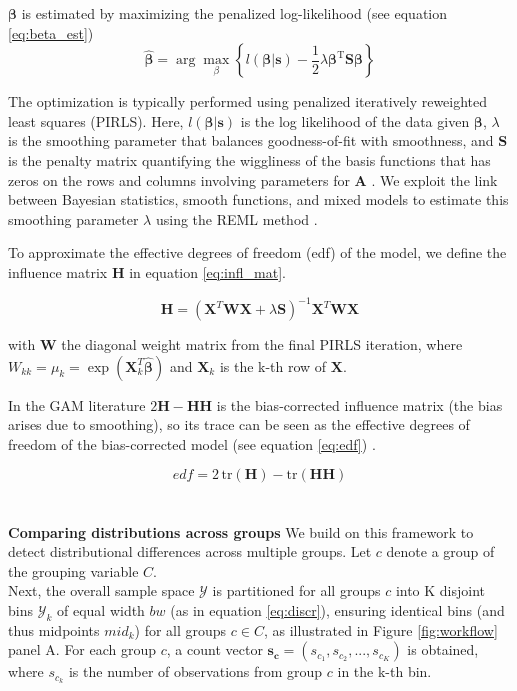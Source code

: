 $\boldsymbol{\beta}$ is estimated by maximizing the penalized log-likelihood (see equation \ref{eq:beta_est})
\begin{equation}
    \hat{\boldsymbol{\beta}}=\arg \max _{\beta}\left\{l(\boldsymbol{\beta}|\boldsymbol{s})-\frac{1}{2} \lambda \boldsymbol{\beta}^{\mathrm{T}} \boldsymbol{S} \boldsymbol{\beta}\right\}
    \label{eq:beta_est}
\end{equation}

The optimization is typically performed using penalized iteratively reweighted least squares (PIRLS). Here, $l(\boldsymbol{\beta}|\boldsymbol{s})$ is the log likelihood of the data given $\boldsymbol{\beta}$, $\lambda$ is the smoothing parameter that balances goodness-of-fit with smoothness, and $\boldsymbol{S}$ is the penalty matrix quantifying the wiggliness of the basis functions that has zeros on the rows and columns involving parameters for $\boldsymbol{A}$ \cite{gambook_gamtheory_setup}. We exploit the link between Bayesian statistics, smooth functions, and mixed models to estimate this smoothing parameter $\lambda$ using the REML method \cite{gambook_gamtheory_reml, ruppert_reml}.

To approximate the effective degrees of freedom (edf) of the model, we define the influence matrix $\boldsymbol{H}$ in equation \ref{eq:infl_mat}.

\begin{equation}
    \boldsymbol{H} = (\boldsymbol{X}^T\boldsymbol{W}\boldsymbol{X} + \lambda \boldsymbol{S})^{-1}\boldsymbol{X}^T\boldsymbol{W}\boldsymbol{X}
    \label{eq:infl_mat}
\end{equation}

with $\boldsymbol{W}$ the diagonal weight matrix from the final PIRLS iteration, where $W_{kk} = \mu_k = \exp(\boldsymbol{X}_k^T \hat{\boldsymbol{\beta}})$ and $\boldsymbol{X}_k$ is the k-th row of $\boldsymbol{X}$.

In the GAM literature $2\boldsymbol{H} - \boldsymbol{H}\boldsymbol{H}$ is the bias-corrected influence matrix (the bias arises due to smoothing), so its trace can be seen as the effective degrees of freedom of the bias-corrected model (see equation \ref{eq:edf}) \cite{gambook_gamtheory_edf}.

\begin{equation}
    edf = 2\,\mathrm{tr}(\boldsymbol{H}) - \mathrm{tr}(\boldsymbol{H}\boldsymbol{H})
    \label{eq:edf}
\end{equation}
\\
\\
\textbf{Comparing distributions across groups} We build on this framework to detect distributional differences across multiple groups. Let $c$ denote a group of the grouping variable $C$.\\
Next, the overall sample space $\mathscr{Y}$ is partitioned for all groups $c$ into K disjoint bins $\mathscr{Y}_k$ of equal width $bw$ (as in equation \ref{eq:discr}), ensuring identical bins (and thus midpoints $mid_k$) for all groups $c \in C$, as illustrated in Figure \ref{fig:workflow} panel A. For each group $c$, a count vector $\boldsymbol{s_c} = (s_{c_1}, s_{c_2},...,s_{c_K})$ is obtained, where $s_{c_k}$ is the number of observations from group $c$ in the k-th bin.

